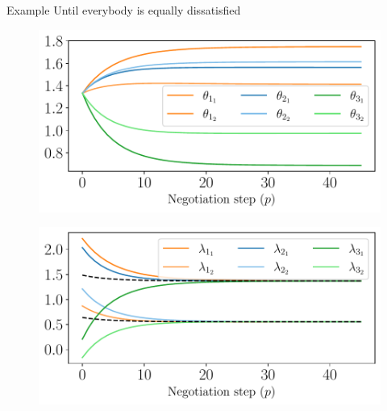 \documentclass[aspectratio=169]{beamer}
\begin{document}
\begin{frame}{Example}
  \centering
  Until everybody is equally dissatisfied
  \vspace{1cm}

  \begin{minipage}{0.45\textwidth}
    \begin{figure}
      \includegraphics[width=\textwidth]{../img/example_primal_decomposition/example_theta.pdf}
    \end{figure}
  \end{minipage}
  \hfill
  \begin{minipage}{0.45\textwidth}
    \begin{figure}
      \centering
      \includegraphics[width=\textwidth]{../img/example_primal_decomposition/example_lambda.pdf}
    \end{figure}
  \end{minipage}
\end{frame}
\end{document}
